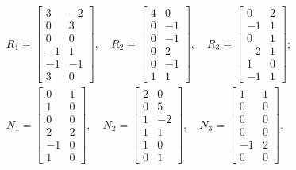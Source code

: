 \documentclass[11pt,reqno,oneside,a4paper]{article}
\theoremstyle{plain} %
\theoremstyle{definition}
\theoremstyle{remark}
\begin{document}
\begin{equation*}
\begin{aligned}
R_1 = \begin{bmatrix} 3 & -2 \\ 0 & 3 \\ 0 & 0 \\ -1 & 1 \\ -1 & -1 \\ 3 & 0 \end{bmatrix}, \quad R_2= \begin{bmatrix} 4 & 0  \\ 0 & -1 \\ 0 & -1 \\ 0 & 2 \\ 0 & -1 \\ 1 & 1 \end{bmatrix}, \quad R_3 = \begin{bmatrix} 0 & 2 \\ -1 & 1 \\ 0 & 1 \\ -2 & 1 \\ 1 & 0 \\ -1 & 1 \end{bmatrix}; \\
N_1 = \begin{bmatrix} 0 & 1 \\ 1 & 0 \\ 0 & 0 \\ 2 & 2 \\ -1 & 0 \\ 1 & 0 \end{bmatrix}, \quad N_2= \begin{bmatrix} 2 & 0  \\ 0 & 5 \\ 1 & -2 \\ 1 & 1 \\ 1 & 0 \\ 0 & 1 \end{bmatrix}, \quad N_3 = \begin{bmatrix} 1 & 1 \\ 0 & 0 \\ 0 & 0 \\ 0 & 0 \\ -1 & 2 \\ 0 & 0 \end{bmatrix}.
\end{aligned}
\end{equation*}
\end{document}
